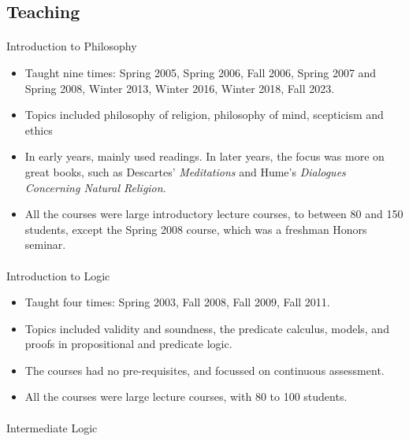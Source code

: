 \documentclass[
  10pt,
  letterpaper,
  DIV=11,
  numbers=noendperiod,
  twoside]{scrartcl}
\makeatletter
\let\oldparagraph\paragraph
\renewcommand{\paragraph}{
    \@ifstar
      \xxxParagraphStar
      \xxxParagraphNoStar
  }
\newcommand{\xxxParagraphStar}[1]{\oldparagraph*{#1}\mbox{}}
\newcommand{\xxxParagraphNoStar}[1]{\oldparagraph{#1}\mbox{}}
\providecommand{\tightlist}{%
  \setlength{\itemsep}{0pt}\setlength{\parskip}{0pt}}\usepackage{longtable,booktabs,array}
\makeatother
\begin{document}
\subsection{Teaching}\label{teaching}

\paragraph{Introduction to Philosophy}\label{introduction-to-philosophy}

\begin{itemize}
\tightlist
\item
  Taught nine times: Spring 2005, Spring 2006, Fall 2006, Spring 2007
  and Spring 2008, Winter 2013, Winter 2016, Winter 2018, Fall 2023.
\item
  Topics included philosophy of religion, philosophy of mind, scepticism
  and ethics
\item
  In early years, mainly used readings. In later years, the focus was
  more on great books, such as Descartes' \emph{Meditations} and Hume's
  \emph{Dialogues Concerning Natural Religion}.
\item
  All the courses were large introductory lecture courses, to between 80
  and 150 students, except the Spring 2008 course, which was a freshman
  Honors seminar.
\end{itemize}

\paragraph{Introduction to Logic}\label{introduction-to-logic}

\begin{itemize}
\tightlist
\item
  Taught four times: Spring 2003, Fall 2008, Fall 2009, Fall 2011.
\item
  Topics included validity and soundness, the predicate calculus,
  models, and proofs in propositional and predicate logic.
\item
  The courses had no pre-requisites, and focussed on continuous
  assessment.
\item
  All the courses were large lecture courses, with 80 to 100 students.
\end{itemize}

\paragraph{Intermediate Logic}\label{intermediate-logic}
\end{document}
